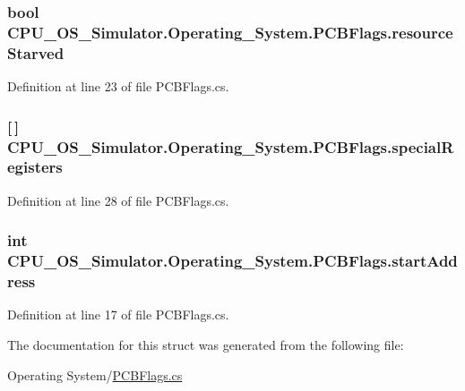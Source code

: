 \subsubsection[{resource\+Starved}]{\setlength{\rightskip}{0pt plus 5cm}bool C\+P\+U\+\_\+\+O\+S\+\_\+\+Simulator.\+Operating\+\_\+\+System.\+P\+C\+B\+Flags.\+resource\+Starved}\label{struct_c_p_u___o_s___simulator_1_1_operating___system_1_1_p_c_b_flags_ad9a23e852aa137ab0289efebb5645b19}


Definition at line 23 of file P\+C\+B\+Flags.\+cs.

\hypertarget{struct_c_p_u___o_s___simulator_1_1_operating___system_1_1_p_c_b_flags_aa313adebffa50118e5fbaa09122b32fd}{}
\subsubsection[{special\+Registers}]{ \mbox{[}$\,$\mbox{]} C\+P\+U\+\_\+\+O\+S\+\_\+\+Simulator.\+Operating\+\_\+\+System.\+P\+C\+B\+Flags.\+special\+Registers}\label{struct_c_p_u___o_s___simulator_1_1_operating___system_1_1_p_c_b_flags_aa313adebffa50118e5fbaa09122b32fd}


Definition at line 28 of file P\+C\+B\+Flags.\+cs.

\hypertarget{struct_c_p_u___o_s___simulator_1_1_operating___system_1_1_p_c_b_flags_a774bd0d595863252698e5dfc36015c50}{}
\subsubsection[{start\+Address}]{\setlength{\rightskip}{0pt plus 5cm}int C\+P\+U\+\_\+\+O\+S\+\_\+\+Simulator.\+Operating\+\_\+\+System.\+P\+C\+B\+Flags.\+start\+Address}\label{struct_c_p_u___o_s___simulator_1_1_operating___system_1_1_p_c_b_flags_a774bd0d595863252698e5dfc36015c50}


Definition at line 17 of file P\+C\+B\+Flags.\+cs.



The documentation for this struct was generated from the following file\+:\begin{DoxyCompactItemize}
\item 
Operating System/\hyperlink{_p_c_b_flags_8cs}{P\+C\+B\+Flags.\+cs}\end{DoxyCompactItemize}
